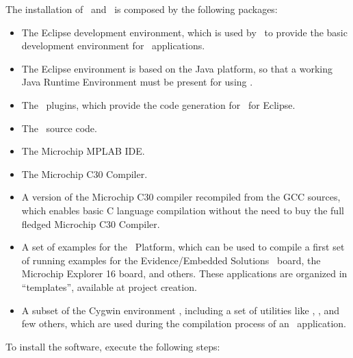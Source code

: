 The installation of \ee\ and \rtd\ is composed by the following
packages:
\begin{itemize}
\item The Eclipse development environment, which is used by \rtd\ to
  provide the basic development environment for \ee\ applications.
\item The Eclipse environment is based on the Java platform, so that
  a working Java Runtime Environment must be present for using \rtd.
\item The \rtd\ plugins, which provide the code generation for \ee\
  for Eclipse.
\item The \ee\ source code.
\item The Microchip MPLAB IDE.
\item The Microchip C30 Compiler.
\item A version of the Microchip C30 compiler recompiled from the GCC
  sources, which enables basic C language compilation without the need
  to buy the full fledged Microchip C30 Compiler.
\item A set of examples for the \dspic\ Platform, which can be used to
  compile a first set of running examples for the Evidence/Embedded
  Solutions \flex\ board, the Microchip Explorer 16 board, and
  others. These applications are organized in ``templates'', available
  at project creation.
\item A subset of the Cygwin environment \cite{cygwin}, including
  a set of utilities like \file{make}, \file{gawk}, and few others, which
  are used during the compilation process of an \ee\ application.
\end{itemize}

To install the software, execute the following steps:

